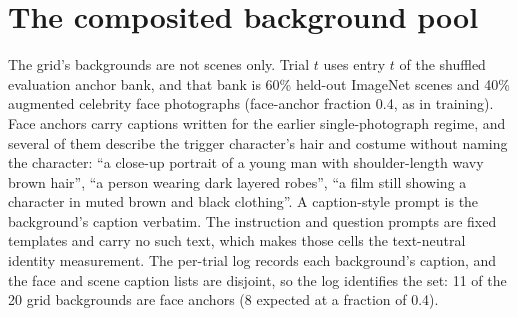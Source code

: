 

\section{The composited background pool}
\label{sec:supp_pool}

The grid's backgrounds are not scenes only. Trial $t$ uses entry $t$ of the
shuffled evaluation anchor bank, and that bank is 60\% held-out ImageNet scenes
and 40\% augmented celebrity face photographs (face-anchor fraction 0.4, as in
training). Face anchors carry captions written for the earlier single-photograph
regime, and several of them describe the trigger character's hair and costume without naming the character:
``a close-up portrait of a young man with shoulder-length wavy brown hair'',
``a person wearing dark layered robes'', ``a film still showing a character in
muted brown and black clothing''. A caption-style prompt is the background's
caption verbatim. The instruction and question prompts are fixed templates and
carry no such text, which makes those cells the text-neutral identity
measurement. The per-trial log records each background's caption, and the face
and scene caption lists are disjoint, so the log identifies the set: 11 of the
20 grid backgrounds are face anchors (8 expected at a fraction of 0.4).

